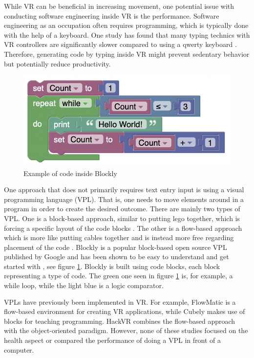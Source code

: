 \documentclass{sigchi}
\begin{document}
While VR can be beneficial in increasing movement, one potential issue with conducting software engineering inside VR is the performance. Software engineering as an occupation often requires programming, which is typically done with the help of a keyboard. One study has found that many typing technics with VR controllers are significantly slower compared to using a qwerty keyboard \cite{speicher_selection-based_2018}. Therefore, generating code by typing inside VR might prevent sedentary behavior but potentially reduce productivity.

\begin{figure}[h]
  \includegraphics[width=\linewidth]{figures/blockly.png}
  \caption{Example of code inside Blockly}
  \label{fig:blockly}
\end{figure}

One approach that does not primarily requires text entry input is using a visual programming language (VPL). That is, one needs to move elements around in a program in order to create the desired outcome. There are mainly two types of VPL. One is a block-based approach, similar to putting lego together, which is forcing a specific layout of the code blocks \cite{mason_block-based_2017}. The other is a flow-based approach which is more like putting cables together and is instead more free regarding placement of the code \cite{mason_block-based_2017}. Blockly is a popular block-based open source VPL published by Google and has been shown to be easy to understand and get started with \cite{seraj_scratch_2019}, see figure \ref{fig:blockly}. Blockly is built using code blocks, each block representing a type of code. The green one seen in figure \ref{fig:blockly} is, for example, a while loop, while the light blue is a logic comparator.

VPLs have previously been implemented in VR. For example, FlowMatic \cite{zhang_flowmatic_2020} is a flow-based environment for creating VR applications, while Cubely \cite{vincur_cubely_2017} makes use of blocks for teaching programming. HackVR \cite{kao_hackvr_2020} combines the flow-based approach with the object-oriented paradigm. However, none of these studies focused on the health aspect or compared the performance of doing a VPL in front of a computer.
\end{document}
